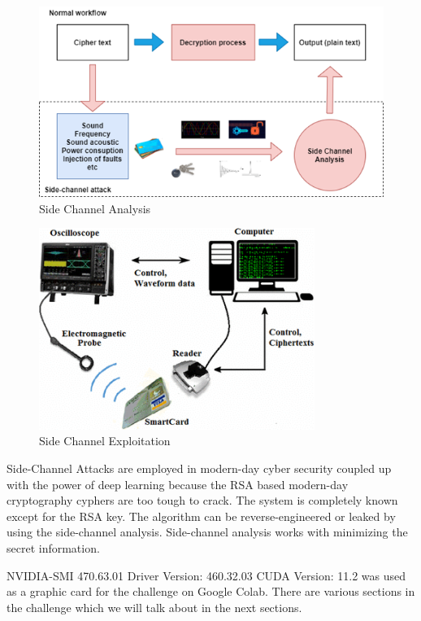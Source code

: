 \documentclass[runningheads]{llncs}
\begin{document}
\begin{figure}
    \includegraphics[width=\textwidth]{images/SCA.png}
    \caption{Side Channel Analysis} \label{fig8}
\end{figure}
\begin{figure}
    \includegraphics[width=0.8\textwidth]{images/Side-channel-analysis-materials.png}
    \caption{Side Channel Exploitation} \label{fig5}
\end{figure}
Side-Channel Attacks are employed in modern-day cyber security coupled up with the power of deep learning because the RSA based modern-day cryptography cyphers are too tough to crack.
The system is completely known except for the RSA key. The algorithm can be reverse-engineered or leaked by using the side-channel analysis. Side-channel analysis works with minimizing the secret 
information. 

NVIDIA-SMI 470.63.01    Driver Version: 460.32.03    CUDA Version: 11.2   was used as a graphic card for the challenge on Google Colab.
There are various sections in the challenge which we will talk about in the next sections.
\end{document}
